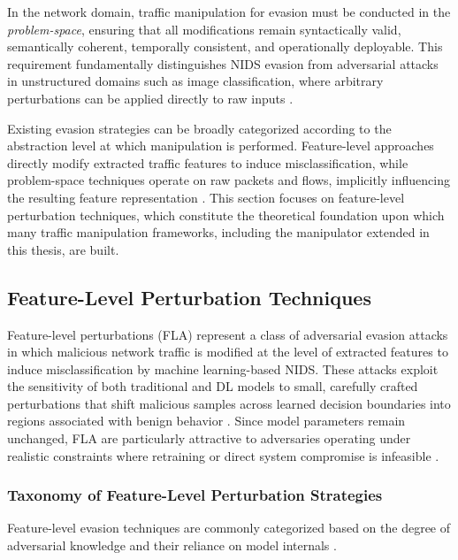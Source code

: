In the network domain, traffic manipulation for evasion must be conducted in the \emph{problem-space}, ensuring that all modifications remain syntactically valid, semantically coherent, temporally consistent, and operationally deployable. This requirement fundamentally distinguishes NIDS evasion from adversarial attacks in unstructured domains such as image classification, where arbitrary perturbations can be applied directly to raw inputs \cite{vitorino2023sok, li2020adversarial}. 

Existing evasion strategies can be broadly categorized according to the abstraction level at which manipulation is performed. Feature-level approaches directly modify extracted traffic features to induce misclassification, while problem-space techniques operate on raw packets and flows, implicitly influencing the resulting feature representation \cite{wang2023evasion}. This section focuses on feature-level perturbation techniques, which constitute the theoretical foundation upon which many traffic manipulation frameworks, including the manipulator extended in this thesis, are built.

\subsection{Feature-Level Perturbation Techniques}

Feature-level perturbations (FLA) represent a class of adversarial evasion attacks in which malicious network traffic is modified at the level of extracted features to induce misclassification by machine learning-based NIDS. These attacks exploit the sensitivity of both traditional and DL models to small, carefully crafted perturbations that shift malicious samples across learned decision boundaries into regions associated with benign behavior \cite{yuan2024simple, zhang2022adversarial}. Since model parameters remain unchanged, FLA are particularly attractive to adversaries operating under realistic constraints where retraining or direct system compromise is infeasible \cite{huang2011adversarial}.

\subsubsection{Taxonomy of Feature-Level Perturbation Strategies}

Feature-level evasion techniques are commonly categorized based on the degree of adversarial knowledge and their reliance on model internals \cite{alotaibi2023adversarial}.

